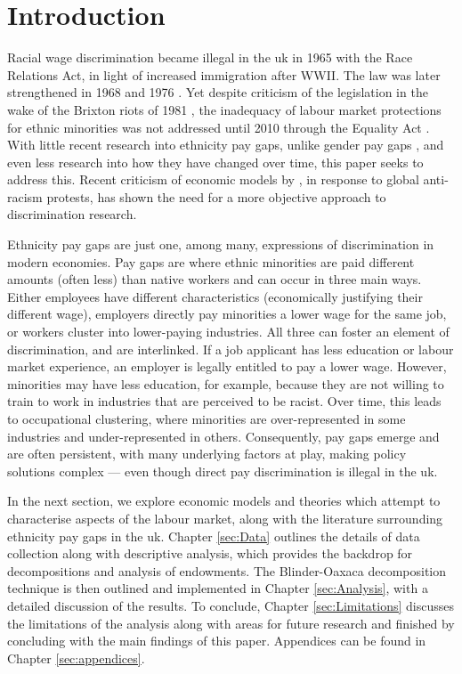 \documentclass[class=article, crop=false]{standalone}
\begin{document}
\pagestyle{plain}
\section{Introduction}
\label{sec:introduction}
Racial wage discrimination became illegal in the \acrshort{uk} in 1965 \citep{GOV} with the Race Relations Act, in light of increased immigration after WWII. The law was later strengthened in 1968 and 1976 \citep{Sooben}. Yet despite criticism of the legislation in the wake of the Brixton riots of 1981 \citep{Solomos}, the inadequacy of labour market protections for ethnic minorities was not addressed until 2010 through the Equality Act \citep{Brown}. With little recent research into ethnicity pay gaps, unlike gender pay gaps \citep{Metcalf}, and even less research into how they have changed over time, this paper seeks to address this. Recent criticism of economic models by \citet{Spriggs}, in response to global anti-racism protests, has shown the need for a more objective approach to discrimination research.

Ethnicity pay gaps are just one, among many, expressions of discrimination in modern economies. Pay gaps are where ethnic minorities are paid different amounts (often less) than native workers and can occur in three main ways. Either employees have different characteristics (economically justifying their different wage), employers directly pay minorities a lower wage for the same job, or workers cluster into lower-paying industries. All three can foster an element of discrimination, and are interlinked. If a job applicant has less education or labour market experience, an employer is legally entitled to pay a lower wage. However, minorities may have less education, for example, because they are not willing to train to work in industries that are perceived to be racist. Over time, this leads to occupational clustering, where minorities are over-represented in some industries and under-represented in others. Consequently, pay gaps emerge and are often persistent, with many underlying factors at play, making policy solutions complex --- even though direct pay discrimination is illegal in the \acrshort{uk}.


In the next section, we explore economic models and theories which attempt to characterise aspects of the labour market, along with the literature surrounding ethnicity pay gaps in the \acrshort{uk}. Chapter \ref{sec:Data} outlines the details of data collection along with descriptive analysis, which provides the backdrop for decompositions and analysis of endowments. The Blinder-Oaxaca decomposition technique is then outlined and implemented in Chapter \ref{sec:Analysis}, with a detailed discussion of the results. To conclude, Chapter \ref{sec:Limitations} discusses the limitations of the analysis along with areas for future research and finished by concluding with the main findings of this paper. Appendices can be found in Chapter \ref{sec:appendices}.
\end{document}
